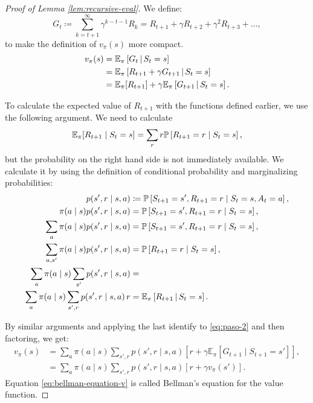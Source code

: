\begin{proof}[Proof of Lemma \ref{lem:recursive-eval}]
	We define:
	\[
		G_t \coloneqq \sum_{k=t+1}^{\infty} \gamma^{k-t-1} R_k = R_{t+1} + \gamma R_{t+2} + \gamma^{2} R_{t+3} + \dots, 
	\]
	to make the definition of $v_\pi (s)$ more compact.
	\begin{align}
		v_\pi (s) &= \mathbb{E}_\pi \left[ G_t \,\middle\vert\, S_t = s \right] \nonumber \\
		&= \mathbb{E}_\pi \left[ R_{t+1} + \gamma G_{t+1} \,\middle\vert\, S_t = s \right] \nonumber \\
		\label{eq:paso-2}
		&= \mathbb{E}_\pi [R_{t+1}] + \gamma \mathbb{E}_\pi \left[ G_{t+1} \,\middle\vert\, S_{t} = s \right].
	\end{align}

	To calculate the expected value of $R_{t+1}$ with the functions defined
	earlier, we use the following argument. We need to calculate
	\[
		\mathbb{E}_\pi [R_{t+1} \mid S_t = s] = \sum_{r} r \mathbb{P}\left[R_{t+1} = r \mid S_t = s\right],
	\]
	but the probability on the right hand side is not immediately available. We
	calculate it by using the definition of conditional probability and
	marginalizing probabilities:
	\begin{align*}
		p(s', r \mid s, a) &\coloneqq \mathbb{P}\left[S_{t+1} = s', R_{t+1} = r \mid S_t = s, A_t = a\right], \\
		\pi(a \mid s) p(s', r \mid s, a) &= \mathbb{P}\left[S_{t+1} = s', R_{t+1} = r \mid S_{t} = s\right], \\
		\sum_{a} \pi(a \mid s) p(s', r \mid s, a) &= \mathbb{P}\left[S_{t+1} = s', R_{t+1} = r \mid S_{t} = s\right], \\
		\sum_{a, s'} \pi(a \mid s) p(s', r \mid s, a) &= \mathbb{P}\left[R_{t+1} = r \mid S_{t} = s\right] , \\
		\sum_{a} \pi(a \mid s) \sum_{s'} p(s', r \mid s, a) &=  \\
		\sum_{a} \pi(a \mid s) \sum_{s', r} p(s', r \mid s, a) \, r &= \mathbb{E}_\pi \left[ R_{t+1} \,\middle\vert\, S_t = s \right].
	\end{align*}

	By similar arguments and applying the last identify to \eqref{eq:paso-2} and
	then factoring, we get:
	\begin{align}
		\label{eq:bellman-equation-v}
		v_\pi (s) &= \sum_a \pi(a \mid s) \sum_{s', r} p(s', r \mid s, a) \left[ r + \gamma \mathbb{E}_\pi [G_{t+1} \mid S_{t+1} = s'] \right], \nonumber \\
		&= \sum_a \pi(a \mid s) \sum_{s', r} p(s', r \mid s, a) \left[ r + \gamma v_\pi (s') \right].
	\end{align}
Equation \eqref{eq:bellman-equation-v} is called Bellman's equation for the
value function.
\end{proof}

